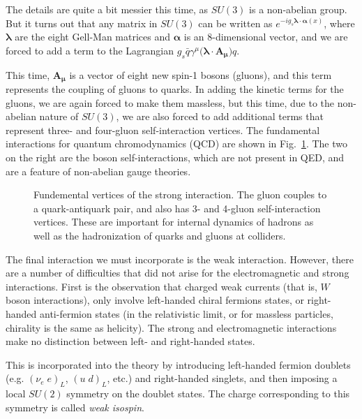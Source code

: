The details are quite a bit messier this time, as $SU(3)$ is a non-abelian group. But it turns out
that any matrix in $SU(3)$ can be written as $e^{-ig_s\boldsymbol\lambda\cdot\boldsymbol\alpha(x)}$, where
$\boldsymbol\lambda$ are the eight Gell-Man matrices and $\boldsymbol\alpha$ is an 8-dimensional vector,
and we are forced to add a term to the Lagrangian $g_s\bar{q}\gamma^\mu\boldsymbol(\boldsymbol\lambda\cdot\mathbf{A_\mu})q$.

This time, $\mathbf{A_\mu}$ is a vector of eight new spin-1 bosons (gluons), and this term represents the coupling of gluons
to quarks. In adding the kinetic terms for the gluons, we are again forced to make them massless, but this time,
due to the non-abelian nature of $SU(3)$, we are also forced to add additional terms that represent three- and four-gluon 
self-interaction vertices. The fundamental interactions for quantum chromodynamics (QCD) are shown in Fig.~\ref{fig:strong_diagrams}.
The two on the right are the boson self-interactions, which are not present in QED, and are a feature of non-abelian
gauge theories.

\begin{figure}[t]
  \addtolength{\abovecaptionskip}{5mm}
  \centering
  \vskip5mm
  
  
  
    \caption{Fundemental vertices of the strong interaction. The gluon couples to a quark-antiquark
      pair, and also has 3- and 4-gluon self-interaction vertices. These are important for internal
      dynamics of hadrons as well as the hadronization of quarks and gluons at colliders.
            }
    \label{fig:strong_diagrams}
\end{figure}

The final interaction we must incorporate is the weak interaction. However, there are a number of difficulties
that did not arise for the electromagnetic and strong interactions. First is the observation that charged weak
currents (that is, $W$ boson interactions), only involve left-handed chiral fermions states, 
or right-handed anti-fermion states (in the relativistic
limit, or for massless particles, chirality is the same as helicity). The strong and electromagnetic
interactions make no distinction between left- and right-handed states. 

This is incorporated into the theory
by introducing left-handed fermion doublets (e.g. $(\nu_e\;e)_L$, $(u\;d)_L$, etc.) and right-handed
singlets, and then imposing a local $SU(2)$ symmetry on the doublet states. The charge corresponding
to this symmetry is called \textit{weak isospin}.

